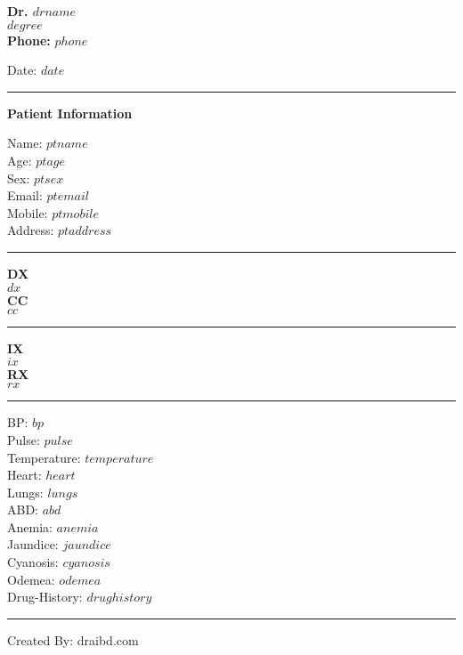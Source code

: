 \documentclass[12pt]{article}
\begin{document}
 
 
\begin{center}
	{\Large \bfseries Dr. $ drname $} \\ 
 
	{ \small $ degree $} 	\\
	{ \small \textbf{Phone:} $ phone $} 	\\
\end{center}
    
 
	\noindent Date: $ date $ 
 
	\noindent \rule{\textwidth}{0.4pt}
	{\noindent \bf Patient Information}
	\begin{multicols}{2}
	\noindent Name: $ ptname $\\
    Age: $ ptage $\\
    Sex: $ ptsex $ \\
    \columnbreak
	Email: $ ptemail $ \\
	Mobile: $ ptmobile $ \\
	Address: $ ptaddress $ \\
	\end{multicols}
	
	\noindent \rule{\textwidth}{0.4pt}
	\begin{multicols}{2}
	\noindent \textbf{DX} \\
	$ dx $ \\
	
    \columnbreak
	\noindent\textbf{CC} \\
	$ cc $ \\
	\end{multicols}
	\noindent\rule{\textwidth}{0.4pt}
	\begin{multicols}{2}
	\noindent \textbf{IX} \\
	$ ix $ \\
	
    \columnbreak
	\noindent\textbf{RX} \\
	$ rx $ \\
	\end{multicols}
	\noindent\rule{\textwidth}{0.4pt}
	\begin{multicols}{2}
	\noindent BP: $ bp $ \\
	Pulse: $ pulse $\\
	Temperature: $ temperature $\\
	Heart: $ heart $\\
	Lungs: $ lungs $\\
	\columnbreak
	ABD: $ abd $\\
	Anemia: $ anemia $\\
	Jaundice: $ jaundice $\\
	Cyanosis: $ cyanosis $\\
	Odemea: $ odemea $\\
	Drug-History: $ drug history $\\
	\end{multicols}
	\noindent \rule{\textwidth}{0.4pt}
	\small{Created By: draibd.com}
 
 
\end{document}
